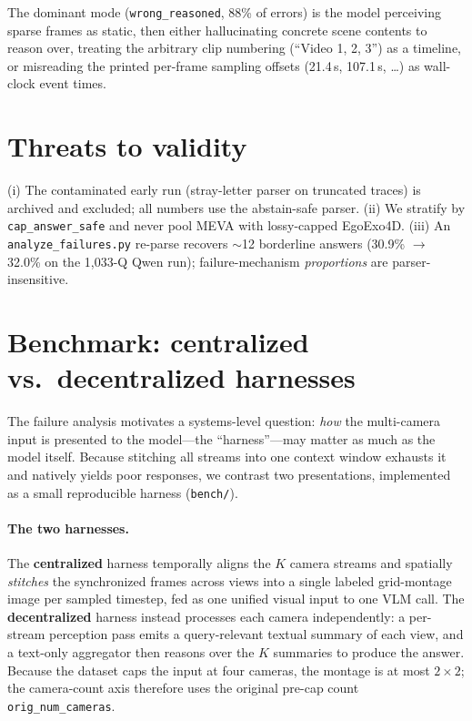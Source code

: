 \documentclass[11pt]{article}
\begin{document}
The dominant mode (\texttt{wrong\_reasoned}, 88\% of errors) is the model perceiving sparse frames as
static, then either hallucinating concrete scene contents to reason over, treating the arbitrary clip
numbering (``Video 1, 2, 3'') as a timeline, or misreading the printed per-frame sampling offsets
(21.4\,s, 107.1\,s, \dots) as wall-clock event times.

\section{Threats to validity}
(i) The contaminated early run (stray-letter parser on truncated traces) is archived and excluded;
all numbers use the abstain-safe parser. (ii) We stratify by \texttt{cap\_answer\_safe} and never pool
MEVA with lossy-capped EgoExo4D. (iii) An \texttt{analyze\_failures.py} re-parse recovers
$\sim$12 borderline answers (30.9\% $\rightarrow$ 32.0\% on the 1,033-Q Qwen run); failure-mechanism
\emph{proportions} are parser-insensitive.

\section{Benchmark: centralized vs.\ decentralized harnesses}
The failure analysis motivates a systems-level question: \emph{how} the multi-camera input is
presented to the model---the ``harness''---may matter as much as the model itself. Because stitching
all streams into one context window exhausts it and natively yields poor responses, we contrast two
presentations, implemented as a small reproducible harness (\texttt{bench/}).

\paragraph{The two harnesses.} The \textbf{centralized} harness temporally aligns the $K$ camera
streams and spatially \emph{stitches} the synchronized frames across views into a single labeled
grid-montage image per sampled timestep, fed as one unified visual input to one VLM call. The
\textbf{decentralized} harness instead processes each camera independently: a per-stream perception
pass emits a query-relevant textual summary of each view, and a text-only aggregator then reasons
over the $K$ summaries to produce the answer. Because the dataset caps the input at four cameras, the
montage is at most $2{\times}2$; the camera-count axis therefore uses the original pre-cap count
\texttt{orig\_num\_cameras}.
\end{document}
